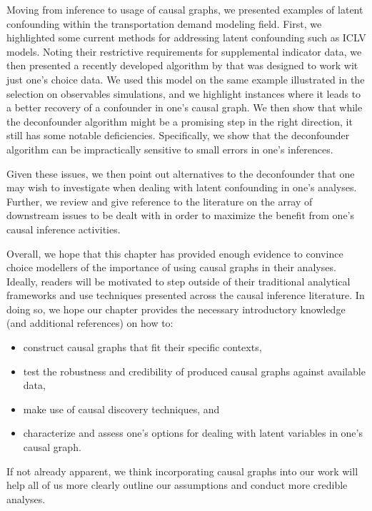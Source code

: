 Moving from inference to usage of causal graphs, we presented examples of latent confounding within the transportation demand modeling field.
First, we highlighted some current methods for addressing latent confounding such as ICLV models.
Noting their restrictive requirements for supplemental indicator data,
we then presented a recently developed algorithm by \citet{wang_2019_blessings}
that was designed to work wit just one's choice data.
We used this model on the same example illustrated in the selection on observables simulations,
and we highlight instances where it leads to a better recovery of a confounder in one's causal graph.
We then show that while the deconfounder algorithm might be a promising step in the right direction,
it still has some notable deficiencies.
Specifically, we show that the deconfounder algorithm can be impractically sensitive to small errors in one's inferences.

Given these issues, we then point out alternatives to the deconfounder that one may wish to investigate when dealing with latent confounding in one's analyses.
Further, we review and give reference to the literature on the array of downstream issues to be dealt with in order to maximize the benefit from one's causal inference activities.

Overall, we hope that this chapter has provided enough evidence to convince choice modellers of the importance of using causal graphs in their analyses.
Ideally, readers will be motivated to step outside of their traditional analytical frameworks and use techniques presented across the causal inference literature.
In doing so, we hope our chapter provides the necessary introductory knowledge (and additional references) on how to:
\begin{itemize}
    \item construct causal graphs that fit their specific contexts,
    \item test the robustness and credibility of produced causal graphs against available data,
    \item make use of causal discovery techniques, and
    \item characterize and assess one's options for dealing with latent variables in one's causal graph.
\end{itemize}
If not already apparent, we think incorporating causal graphs into our work will help all of us more clearly outline our assumptions and conduct more credible analyses.
